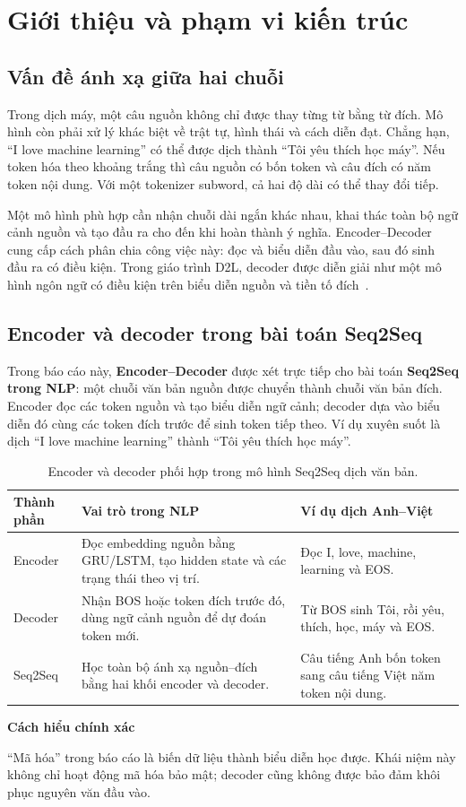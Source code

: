 \documentclass[11pt,a4paper]{article}
\numberwithin{equation}{section}
\newcommand{\notebox}[2]{\par\smallskip\noindent
  \begingroup\setlength{\fboxsep}{10pt}\colorbox{PaleBlue}{%
  \parbox{\dimexpr\linewidth-20pt\relax}{\textbf{\color{ReportBlue}#1}\par\smallskip #2}}%
  \endgroup\par\smallskip}
\begin{document}
\section{Giới thiệu và phạm vi kiến trúc}
\subsection{Vấn đề ánh xạ giữa hai chuỗi}
Trong dịch máy, một câu nguồn không chỉ được thay từng từ bằng từ đích. Mô hình còn phải xử lý khác biệt về trật tự, hình thái và cách diễn đạt. Chẳng hạn, ``I love machine learning'' có thể được dịch thành ``Tôi yêu thích học máy''. Nếu token hóa theo khoảng trắng thì câu nguồn có bốn token và câu đích có năm token nội dung. Với một tokenizer subword, cả hai độ dài có thể thay đổi tiếp.

Một mô hình phù hợp cần nhận chuỗi dài ngắn khác nhau, khai thác toàn bộ ngữ cảnh nguồn và tạo đầu ra cho đến khi hoàn thành ý nghĩa. Encoder--Decoder cung cấp cách phân chia công việc này: đọc và biểu diễn đầu vào, sau đó sinh đầu ra có điều kiện. Trong giáo trình D2L, decoder được diễn giải như một mô hình ngôn ngữ có điều kiện trên biểu diễn nguồn và tiền tố đích~\cite{d2larch}.

\subsection{Encoder và decoder trong bài toán Seq2Seq}
Trong báo cáo này, \textbf{Encoder--Decoder} được xét trực tiếp cho bài toán \textbf{Seq2Seq trong NLP}: một chuỗi văn bản nguồn được chuyển thành chuỗi văn bản đích. Encoder đọc các token nguồn và tạo biểu diễn ngữ cảnh; decoder dựa vào biểu diễn đó cùng các token đích trước để sinh token tiếp theo. Ví dụ xuyên suốt là dịch ``I love machine learning'' thành ``Tôi yêu thích học máy''.

\begin{table}[H]
\centering\small
\begin{tabularx}{\linewidth}{@{}p{3cm}YY@{}}
\toprule
{}Thành phần & Vai trò trong NLP & Ví dụ dịch Anh--Việt\\\midrule
Encoder & Đọc embedding nguồn bằng GRU/LSTM, tạo hidden state và các trạng thái theo vị trí. & Đọc I, love, machine, learning và EOS.\\
Decoder & Nhận BOS hoặc token đích trước đó, dùng ngữ cảnh nguồn để dự đoán token mới. & Từ BOS sinh Tôi, rồi yêu, thích, học, máy và EOS.\\
Seq2Seq & Học toàn bộ ánh xạ nguồn--đích bằng hai khối encoder và decoder. & Câu tiếng Anh bốn token sang câu tiếng Việt năm token nội dung.\\
\bottomrule
\end{tabularx}
\caption{Encoder và decoder phối hợp trong mô hình Seq2Seq dịch văn bản.}
\end{table}
\notebox{Cách hiểu chính xác}{``Mã hóa'' trong báo cáo là biến dữ liệu thành biểu diễn học được. Khái niệm này không chỉ hoạt động mã hóa bảo mật; decoder cũng không được bảo đảm khôi phục nguyên văn đầu vào.}
\end{document}
